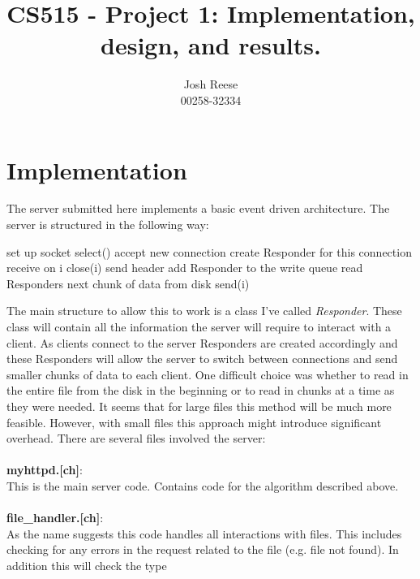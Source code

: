 \documentclass[10pt]{report}
\begin{document}
\title{CS515 - Project 1: Implementation, design, and results.}
\author{Josh Reese\\00258-32334}
\maketitle

\section{Implementation}
The server submitted here implements a basic event driven
architecture. The server is structured in the following way:
\begin{algorithmic}
  \State set up socket
  \State select()
  \State accept new connection
  \State create Responder for this connection
  \Else
  \State receive on i
  \State close(i)
  \Else
  \State send header
  \State add Responder to the write queue
  \EndIf
  \EndIf
  \EndIf
  \State read Responders next chunk of data from disk
  \State send(i)
  \EndIf
  \EndFor
  \EndWhile

\end{algorithmic}
The main structure to allow this to work is a class I've
called \emph{Responder}. These class will contain all the information
the server will require to interact with a client. As clients connect
to the server Responders are created accordingly and these Responders
will allow the server to switch between connections and send smaller
chunks of data to each client. One difficult choice was whether to
read in the entire file from the disk in the beginning or to read in
chunks at a time as they were needed. It seems that for large files
this method will be much more feasible. However, with small files this
approach might introduce significant overhead. There are several files
involved the server:\\\\
{\bf myhttpd.[ch]}:\\
This is the main server code. Contains code for the algorithm
described above.\\\\
{\bf file\_handler.[ch]}:\\
As the name suggests this code handles all interactions with
files. This includes checking for any errors in the request related to
the file (e.g. file not found). In addition this will check the type
\end{document}
